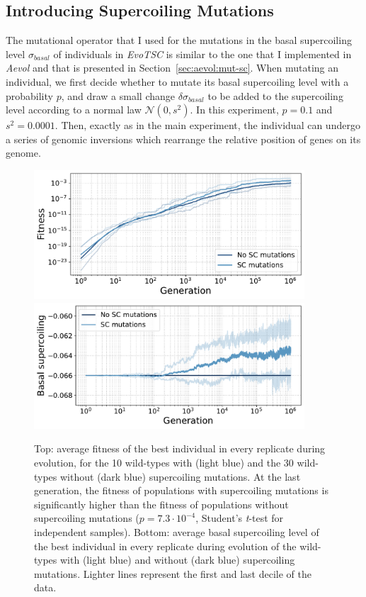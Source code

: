 \subsection{Introducing Supercoiling Mutations}

The mutational operator that I used for the mutations in the basal supercoiling level $\sigma_{basal}$ of individuals in \emph{EvoTSC} is similar to the one that I implemented in \emph{Aevol} and that is presented in Section~\ref{sec:aevol:mut-sc}.
When mutating an individual, we first decide whether to mutate its basal supercoiling level with a probability $p$, and draw a small change $\delta\sigma_{basal}$ to be added to the supercoiling level according to a normal law $\mathcal{N}(0, s^2)$.
In this experiment, $p=0.1$ and $s^2=0.0001$.
Then, exactly as in the main experiment, the individual can undergo a series of genomic inversions which rearrange the relative position of genes on its genome.

\begin{figure}
\centering
\includegraphics[width=0.9\textwidth]{epistasis/img/wt-with-sc/fitness_all_with_main.pdf}
\includegraphics[width=0.9\textwidth]{epistasis/img/wt-with-sc/basal_sc_all.pdf}
\caption[Average basal supercoiling and fitness during evolution of the wild-types, with basal supercoiling level mutations]{Top: average fitness of the best individual in every replicate during evolution, for the 10 wild-types with (light blue) and the 30 wild-types without (dark blue) supercoiling mutations.
At the last generation, the fitness of populations with supercoiling mutations is significantly higher than the fitness of populations without supercoiling mutations ($p = 7.3\cdot10^{-4}$, Student's \emph{t}-test for independent samples).
Bottom: average basal supercoiling level of the best individual in every replicate during evolution of the wild-types with (light blue) and without (dark blue) supercoiling mutations.
Lighter lines represent the first and last decile of the data.}
\label{fig:epistasis:wt-evolution}
\end{figure}

